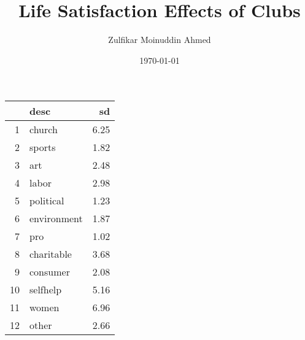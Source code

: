 \documentclass{amsart}
\title{Life Satisfaction Effects of Clubs}
\author{Zulfikar Moinuddin Ahmed}
\date{\today}
\begin{document}
\maketitle

\begin{table}[ht]
\centering
\begin{tabular}{rlr}
  \hline
 & desc & sd \\ 
  \hline
1 & church & 6.25 \\ 
  2 & sports & 1.82 \\ 
  3 & art & 2.48 \\ 
  4 & labor & 2.98 \\ 
  5 & political & 1.23 \\ 
  6 & environment & 1.87 \\ 
  7 & pro & 1.02 \\ 
  8 & charitable & 3.68 \\ 
  9 & consumer & 2.08 \\ 
  10 & selfhelp & 5.16 \\ 
  11 & women & 6.96 \\ 
  12 & other & 2.66 \\ 
   \hline
\end{tabular}
\end{table}
\end{document}
